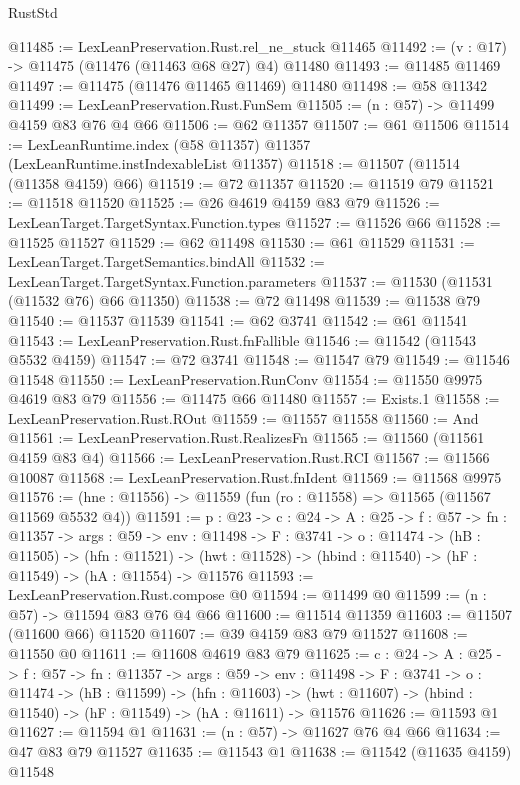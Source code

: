 \begin{lexlean}{RustStd}
\begin{coremodule}
@11485 := LexLeanPreservation.Rust.rel_ne_stuck @11465
@11492 := (v : @17) -> @11475 (@11476 (@11463 @68 @27) @4) @11480
@11493 := @11485 @11469
@11497 := @11475 (@11476 @11465 @11469) @11480
@11498 := @58 @11342
@11499 := LexLeanPreservation.Rust.FunSem
@11505 := (n : @57) -> @11499 @4159 @83 @76 @4 @66
@11506 := @62 @11357
@11507 := @61 @11506
@11514 := LexLeanRuntime.index (@58 @11357) @11357 (LexLeanRuntime.instIndexableList @11357)
@11518 := @11507 (@11514 (@11358 @4159) @66)
@11519 := @72 @11357
@11520 := @11519 @79
@11521 := @11518 @11520
@11525 := @26 @4619 @4159 @83 @79
@11526 := LexLeanTarget.TargetSyntax.Function.types
@11527 := @11526 @66
@11528 := @11525 @11527
@11529 := @62 @11498
@11530 := @61 @11529
@11531 := LexLeanTarget.TargetSemantics.bindAll
@11532 := LexLeanTarget.TargetSyntax.Function.parameters
@11537 := @11530 (@11531 (@11532 @76) @66 @11350)
@11538 := @72 @11498
@11539 := @11538 @79
@11540 := @11537 @11539
@11541 := @62 @3741
@11542 := @61 @11541
@11543 := LexLeanPreservation.Rust.fnFallible
@11546 := @11542 (@11543 @5532 @4159)
@11547 := @72 @3741
@11548 := @11547 @79
@11549 := @11546 @11548
@11550 := LexLeanPreservation.RunConv
@11554 := @11550 @9975 @4619 @83 @79
@11556 := @11475 @66 @11480
@11557 := Exists.{1}
@11558 := LexLeanPreservation.Rust.ROut
@11559 := @11557 @11558
@11560 := And
@11561 := LexLeanPreservation.Rust.RealizesFn
@11565 := @11560 (@11561 @4159 @83 @4)
@11566 := LexLeanPreservation.Rust.RCI
@11567 := @11566 @10087
@11568 := LexLeanPreservation.Rust.fnIdent
@11569 := @11568 @9975
@11576 := (hne : @11556) -> @11559 (fun (ro : @11558) => @11565 (@11567 @11569 @5532 @4))
@11591 := {p : @23} ->
  {c : @24} ->
  {A : @25} ->
  {f : @57} ->
  {fn : @11357} ->
  {args : @59} ->
  {env : @11498} ->
  {F : @3741} ->
  {o : @11474} ->
  (hB : @11505) ->
  (hfn : @11521) -> (hwt : @11528) -> (hbind : @11540) -> (hF : @11549) -> (hA : @11554) -> @11576
@11593 := LexLeanPreservation.Rust.compose @0
@11594 := @11499 @0
@11599 := (n : @57) -> @11594 @83 @76 @4 @66
@11600 := @11514 @11359
@11603 := @11507 (@11600 @66) @11520
@11607 := @39 @4159 @83 @79 @11527
@11608 := @11550 @0
@11611 := @11608 @4619 @83 @79
@11625 := {c : @24} ->
  {A : @25} ->
  {f : @57} ->
  {fn : @11357} ->
  {args : @59} ->
  {env : @11498} ->
  {F : @3741} ->
  {o : @11474} ->
  (hB : @11599) ->
  (hfn : @11603) -> (hwt : @11607) -> (hbind : @11540) -> (hF : @11549) -> (hA : @11611) -> @11576
@11626 := @11593 @1
@11627 := @11594 @1
@11631 := (n : @57) -> @11627 @76 @4 @66
@11634 := @47 @83 @79 @11527
@11635 := @11543 @1
@11638 := @11542 (@11635 @4159) @11548

\end{coremodule}
\end{lexlean}
